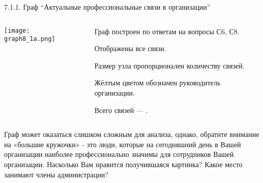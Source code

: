 \begin{frame}{7.1.1. Граф ``Актуальные профессиональные связи в организации''}

\begin{columns} 
\begin{column}{0.7\textwidth} 
\centering
          \texttt{[image: graph8\_1a.png]}
\end{column}
\begin{column}{0.25\textwidth} 

\tiny
Граф построен по ответам на вопросы С6, С8.
\smallskip

Отображены все связи. 
\smallskip

Размер узла пропорционален количеству связей.
\smallskip

Жёлтым цветом обозначен руководитель организации.
\bigskip

Всего связей --- \valHAAlinks.

\end{column}
\end{columns}

\fontsize{6pt}{7}\selectfont
Граф может оказаться слишком сложным для анализа, однако, 
обратите внимание на «большие кружочки» - это люди, которые на сегодняшний день в Вашей организации наиболее 
профессионально значимы для сотрудников Вашей организации. Насколько Вам нравится получившаяся картинка? 
Какое место занимают члены администрации?

\end{frame}


